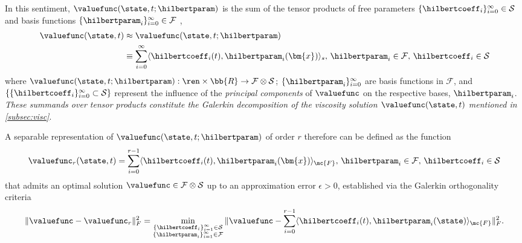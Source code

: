 In this sentiment, $\valuefunc (\state,t; \hilbertparam)$ is the sum of the tensor products of free parameters  $\{\hilbertcoeff_i\}_{i=0}^\infty \in \mathcal{S}$ and basis functions $\{\hilbertparam_i\}_{i=0}^\infty \in \mathcal{F}$ \ie,   
%
\begin{subequations}
	\begin{align}
		\valuefunc(\state, t) &\approx \valuefunc(\state, t; \hilbertparam) \\
		&\equiv \sum_{i=0}^\infty \langle\hilbertcoeff_i(t), \hilbertparam_i(\bm{x})\rangle_{s}, \, \hilbertparam_i \in \mathcal{F}, \, \hilbertcoeff_i \in  \mathcal{S}
	\end{align} 
	\label{eq:decomp_general}
\end{subequations}
%
\noindent where $\valuefunc(\state, t; \hilbertparam): \ren \times \bb{R} \rightarrow \mathcal{F} \otimes \mathcal{S}$;  $\{\hilbertparam_i\}_{i=0}^\infty$ are basis functions in $\mathcal{F}$, and  $\{\{\hilbertcoeff_i\}_{i=0}^\infty  \subset \mathcal{S}\}$ represent the influence of the \textit{principal components} of $\valuefunc$ on the respective bases, $\hilbertparam_i$.  \textit{These summands over tensor products constitute the Galerkin decomposition of the viscosity solution $\valuefunc (\state,t)$ mentioned in \autoref{subsec:visc}}. 

A separable representation  of $\valuefunc(\state, t; \hilbertparam)$ of order $r$ therefore can be defined as the function
%
\begin{align}
	\valuefunc_r(\state, t) = \sum_{i=0}^{r-1} \langle \hilbertcoeff_i(t),  \hilbertparam_i(\bm{x}) \rangle_{\mc{F}}, \, \hilbertparam_i \in \mathcal{F}, \, \hilbertcoeff_i \in  \mathcal{S}
	\label{eq:decomp_reduced}
\end{align} 
%
that admits an optimal solution $\valuefunc \in  \mathcal{F} \otimes \mathcal{S}$ up to an approximation error $\epsilon>0$, established  via the Galerkin orthogonality criteria 
%
\begin{align}
	\| \valuefunc - \valuefunc_r \|^2_{F} = \min_{\substack{\{\hilbertcoeff_i\}_{i=1}^\infty \in \mathcal{S} \\ \{\hilbertparam_i\}_{i=1}^\infty \in \mathcal{F} }} \|\valuefunc - \sum_{i=0}^{r-1} \langle \hilbertcoeff_i(t), \hilbertparam_i(\state) \rangle_{\mc{F}} \|_F^2.
	\label{eq:galerk_orth_crit_reduced}
\end{align}
%

